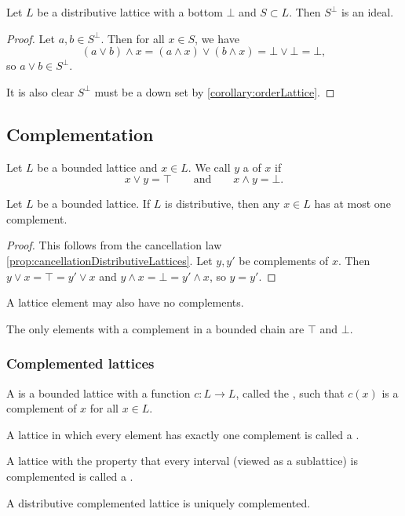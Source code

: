\begin{lemma} \label{lemma:disjointComplementIdeal}
Let $L$ be a distributive lattice with a bottom $\bot$ and $S\subset L$. Then $S^\perp$ is an ideal.
\end{lemma}
\begin{proof}
Let $a,b\in S^\perp$. Then for all $x\in S$, we have
\[ (a\vee b)\wedge x = (a\wedge x)\vee (b\wedge x) = \bot\vee \bot = \bot, \]
so $a\vee b\in S^\perp$.

It is also clear $S^\perp$ must be a down set by \ref{corollary:orderLattice}.
\end{proof}

\subsection{Complementation}
\begin{definition}
Let $L$ be a bounded lattice and $x\in L$. We call $y$ a  of $x$ if
\[ x \vee y = \top \qquad \text{and} \qquad x\wedge y = \bot. \]
\end{definition}

\begin{proposition} \label{prop:distributiveComplementUnique}
Let $L$ be a bounded lattice. If $L$ is distributive, then any $x\in L$ has at most one complement.
\end{proposition}
\begin{proof}
This follows from the cancellation law \ref{prop:cancellationDistributiveLattices}. Let $y,y'$ be complements of $x$. Then $y\vee x = \top = y'\vee x$ and $y\wedge x = \bot = y'\wedge x$, so $y=y'$.
\end{proof}

A lattice element may also have no complements.
\begin{example}
The only elements with a complement in a bounded chain are $\top$ and $\bot$.
\end{example}

\subsubsection{Complemented lattices}
\begin{definition}
A  is a bounded lattice with a function $c:L\to L$, called the , such that $c(x)$ is a complement of $x$ for all $x\in L$.

A lattice in which every element has exactly one complement is called a .

A lattice with the property that every interval (viewed as a sublattice) is complemented is called a .
\end{definition}
A distributive complemented lattice is uniquely complemented.

